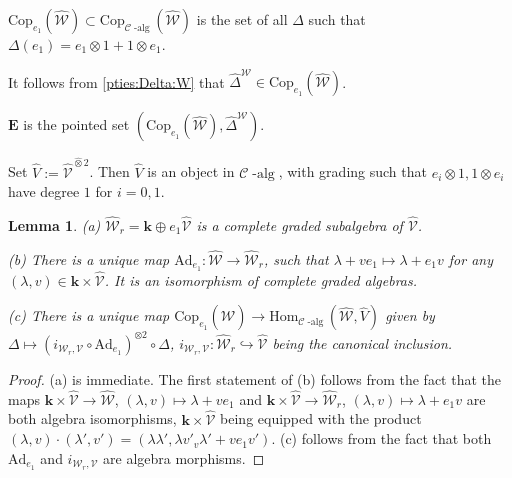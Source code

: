 \documentclass[10pt]{amsart}
\newtheorem{lem}[thm]{Lemma}
\numberwithin{equation}{subsection}
\begin{document}
\begin{defn}
 $\mathrm{Cop}_{e_1}(\hat{\mathcal W})\subset \mathrm{Cop}_{{\mathcal C}\operatorname{-alg}}(\hat{\mathcal W})$ 
 is the set of all $\Delta$ such that $\Delta(e_1)=e_1 \otimes1+1\otimes e_1$.   
\end{defn}

It follows from \eqref{pties:Delta:W} that $\hat\Delta^{\mathcal W} \in \mathrm{Cop}_{e_1}(\hat{\mathcal W})$. 

\begin{defn}\label{def:E:1001}
 $\mathbf E$ is the pointed set $(\mathrm{Cop}_{e_1}(\hat{\mathcal W}),\hat\Delta^{\mathcal W})$.
\end{defn}

\begin{defn}
Set $\hat V:=\hat{\mathcal V}^{\hat\otimes2}$. Then $\hat V$ is an object in $\mathcal C\operatorname{-alg}$, with grading such that 
$e_i\otimes1,1\otimes e_i$ have degree $1$ for $i=0,1$.    
\end{defn}

\begin{lem}\label{lem:toto:0930}
(a) $\hat{\mathcal W}_r=\mathbf k\oplus e_1\hat{\mathcal V}$ is a complete graded subalgebra of $\hat{\mathcal V}$. 

(b) There is a unique map $\mathrm{Ad}_{e_1} : \hat{\mathcal W}\to\hat{\mathcal W}_r$, such that 
$\lambda+ve_1\mapsto \lambda+e_1v$ for any $(\lambda,v)\in\mathbf k\times\hat{\mathcal V}$. It is an 
isomorphism of complete graded algebras. 
   
(c) There is a unique map $\mathrm{Cop}_{e_1}(\hat{\mathcal W})\to 
\mathrm{Hom}_{\mathcal C\operatorname{-alg}}(\hat{\mathcal W},\hat V)$ given by 
$\Delta\mapsto(i_{\mathcal W_r,\mathcal V}\circ\mathrm{Ad}_{e_1})^{\otimes2}\circ\Delta$, 
$i_{\mathcal W_r,\mathcal V} : \hat{\mathcal W}_r\hookrightarrow\hat{\mathcal V}$ being the 
canonical inclusion. 
\end{lem}

\begin{proof}
    (a) is immediate. The first statement of (b) follows from the fact that the maps 
    $\mathbf k\times\hat{\mathcal V}\to \hat{\mathcal W}$, $(\lambda,v)\mapsto \lambda+ve_1$ and 
$\mathbf k\times\hat{\mathcal V}\to \hat{\mathcal W}_r$, $(\lambda,v)\mapsto \lambda+e_1v$
are both algebra isomorphisms, $\mathbf k\times\hat{\mathcal V}$ being equipped with the product 
$(\lambda,v)\cdot (\lambda',v')=(\lambda\lambda',\lambda v'_v\lambda'+ve_1v')$. 
(c) follows from the fact that both $\mathrm{Ad}_{e_1}$ and $i_{\mathcal W_r,\mathcal V}$
are algebra morphisms. 
\end{proof}
\end{document}
